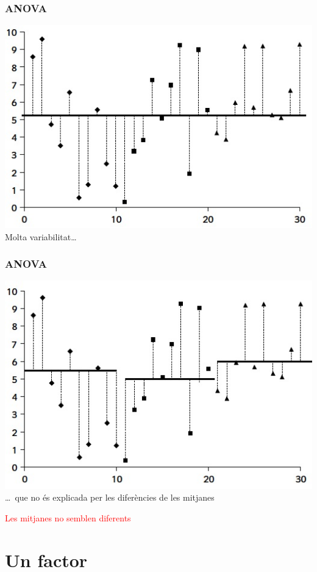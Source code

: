 \documentclass[12pt,t]{beamer}
\newcommand{\red}[1]{\textcolor{red}{#1}}
\theoremstyle{plain}
\theoremstyle{definition}
\begin{document}
\begin{frame}
\frametitle{ANOVA}

\begin{center}
\includegraphics[width=0.8\linewidth]{FD2-1}\\
Molta variabilitat\ldots 
\end{center}
\end{frame}

\begin{frame}
\frametitle{ANOVA}

\begin{center}
\includegraphics[width=0.8\linewidth]{FD2-2}\\
\ldots\ que no és explicada per les diferències de les mitjanes\\ 
\medskip

\red{Les mitjanes no semblen diferents}
\end{center}
\end{frame}



\section{Un factor}
\end{document}
